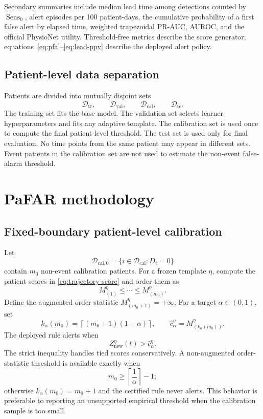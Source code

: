 \documentclass[11pt]{article}
\newcommand{\calD}{\mathcal{D}}
\newcommand{\Sens}{\operatorname{Sens}}
\begin{document}
Secondary summaries include median lead time among detections counted by $\Sens_0$, alert episodes per 100 patient-days, the cumulative probability of a first false alert by elapsed time, weighted trapezoidal PR-AUC, AUROC, and the official PhysioNet utility. Threshold-free metrics describe the score generator; equations~\eqref{eq:pfa}--\eqref{eq:lead-ppv} describe the deployed alert policy.

\subsection{Patient-level data separation}

Patients are divided into mutually disjoint sets
\[
\calD_{\mathrm{tr}},\qquad
\calD_{\mathrm{val}},\qquad
\calD_{\mathrm{cal}},\qquad
\calD_{\mathrm{te}}.
\]
The training set fits the base model. The validation set selects learner hyperparameters and fits any adaptive template. The calibration set is used once to compute the final patient-level threshold. The test set is used only for final evaluation. No time points from the same patient may appear in different sets. Event patients in the calibration set are not used to estimate the non-event false-alarm threshold.
\section{PaFAR methodology}\label{sec:method}

\subsection{Fixed-boundary patient-level calibration}

Let
\[
\calD_{\mathrm{cal},0}=\{i\in\calD_{\mathrm{cal}}:D_i=0\}
\]
contain $m_0$ non-event calibration patients. For a frozen template $\eta$, compute the patient scores in \eqref{eq:trajectory-score} and order them as
\[
M_{(1)}^{\eta}\le\cdots\le M_{(m_0)}^{\eta}.
\]
Define the augmented order statistic $M_{(m_0+1)}^{\eta}=+\infty$. For a target $\alpha\in(0,1)$, set
\begin{equation}
k_{\alpha}(m_0)=\left\lceil(m_0+1)(1-\alpha)\right\rceil,
\qquad
\widehat c_{\alpha}^{\eta}=M_{(k_{\alpha}(m_0))}^{\eta}.
\label{eq:conformal-threshold}
\end{equation}
The deployed rule alerts when
\begin{equation}
Z_{\mathrm{new}}^{\eta}(t)>\widehat c_{\alpha}^{\eta}.
\label{eq:alert-rule}
\end{equation}
The strict inequality handles tied scores conservatively. A non-augmented order-statistic threshold is available exactly when
\begin{equation}
m_0\ge \left\lceil\frac{1}{\alpha}\right\rceil-1;
\label{eq:min-cal-marginal}
\end{equation}
otherwise $k_{\alpha}(m_0)=m_0+1$ and the certified rule never alerts. This behavior is preferable to reporting an unsupported empirical threshold when the calibration sample is too small.
\end{document}
